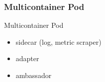 \subsubsection{Multicontainer Pod}
\begin{frame}[fragile]{Multicontainer Pod}
  \begin{itemize}
  \item sidecar (log, metric scraper)
  \item adapter
  \item ambassador
  \end{itemize}
\end{frame}

